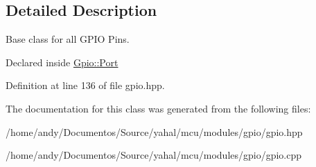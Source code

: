\subsection{Detailed Description}
Base class for all G\+P\+I\+O Pins. 

Declared inside \hyperlink{classyahal_1_1mcu_1_1_gpio_1_1_port}{Gpio\+::\+Port} 

Definition at line 136 of file gpio.\+hpp.



The documentation for this class was generated from the following files\+:\begin{DoxyCompactItemize}
\item 
/home/andy/\+Documentos/\+Source/yahal/mcu/modules/gpio/gpio.\+hpp\item 
/home/andy/\+Documentos/\+Source/yahal/mcu/modules/gpio/gpio.\+cpp\end{DoxyCompactItemize}
